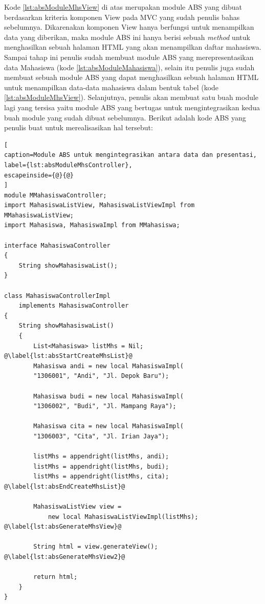Kode \ref{lst:absModuleMhsView} di atas merupakan module ABS yang dibuat berdasarkan kriteria komponen View pada MVC yang sudah penulis bahas sebelumnya. Dikarenakan komponen View hanya berfungsi untuk menampilkan data yang diberikan, maka module ABS ini hanya berisi sebuah \textit{method} untuk menghasilkan sebuah halaman HTML yang akan menampilkan daftar mahasiswa.\\

Sampai tahap ini penulis sudah membuat module ABS yang merepresentasikan data Mahasiswa (kode \ref{lst:absModuleMahasiswa}), selain itu penulis juga sudah membuat sebuah module ABS yang dapat menghasilkan sebuah halaman HTML untuk menampilkan data-data mahasiswa dalam bentuk tabel (kode \ref{lst:absModuleMhsView}). Selanjutnya, penulis akan membuat satu buah module lagi yang tersisa yaitu module ABS yang bertugas untuk mengintegrasikan kedua buah module yang sudah dibuat sebelumnya. Berikut adalah kode ABS yang penulis buat untuk merealisasikan hal tersebut:

\begin{lstlisting}[
caption=Module ABS untuk mengintegrasikan antara data dan presentasi,
label={lst:absModuleMhsController},
escapeinside={@}{@}
]
module MMahasiswaController;
import MahasiswaListView, MahasiswaListViewImpl from MMahasiswaListView;
import Mahasiswa, MahasiswaImpl from MMahasiswa;

interface MahasiswaController
{
	String showMahasiswaList();
}

class MahasiswaControllerImpl 
	implements MahasiswaController
{
	String showMahasiswaList()
	{
		List<Mahasiswa> listMhs = Nil; @\label{lst:absStartCreateMhsList}@
		Mahasiswa andi = new local MahasiswaImpl(
		"1306001", "Andi", "Jl. Depok Baru");
		
		Mahasiswa budi = new local MahasiswaImpl(
		"1306002", "Budi", "Jl. Mampang Raya");
		
		Mahasiswa cita = new local MahasiswaImpl(
		"1306003", "Cita", "Jl. Irian Jaya");
		
		listMhs = appendright(listMhs, andi);
		listMhs = appendright(listMhs, budi);
		listMhs = appendright(listMhs, cita); @\label{lst:absEndCreateMhsList}@
		
		MahasiswaListView view = 
			new local MahasiswaListViewImpl(listMhs); @\label{lst:absGenerateMhsView}@
		
		String html = view.generateView(); @\label{lst:absGenerateMhsView2}@
		
		return html;
	}
}
\end{lstlisting}

